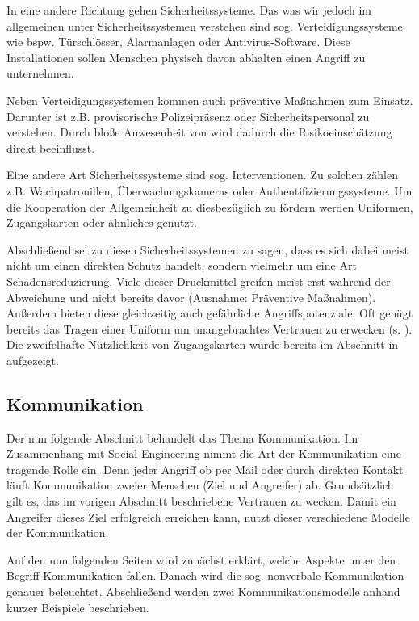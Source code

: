 In eine andere Richtung gehen Sicherheitssysteme. Das was wir jedoch im allgemeinen unter Sicherheitssystemen verstehen sind sog. Verteidigungssysteme wie bspw. Türschlösser, Alarmanlagen oder Antivirus-Software.
Diese Installationen sollen Menschen physisch davon abhalten einen Angriff zu unternehmen.

Neben Verteidigungssystemen kommen auch präventive Maßnahmen zum Einsatz.
Darunter ist z.B. provisorische Polizeipräsenz oder Sicherheitspersonal zu verstehen.
Durch bloße Anwesenheit von wird dadurch die Risikoeinschätzung direkt beeinflusst.

Eine andere Art Sicherheitssysteme sind sog. Interventionen. Zu solchen zählen z.B. Wachpatrouillen, Überwachungskameras oder Authentifizierungssysteme.
Um die Kooperation der Allgemeinheit zu diesbezüglich zu fördern werden Uniformen, Zugangskarten oder ähnliches genutzt.
\cite{liars-and-outliers}

Abschließend sei zu diesen Sicherheitssystemen zu sagen, dass es sich dabei meist nicht um einen direkten Schutz handelt, sondern vielmehr um eine Art Schadensreduzierung.
Viele dieser Druckmittel greifen meist erst während der Abweichung und nicht bereits davor (Ausnahme: Präventive Maßnahmen).
Außerdem bieten diese  gleichzeitig auch gefährliche Angriffspotenziale.
Oft genügt bereits das Tragen einer Uniform um unangebrachtes Vertrauen zu erwecken (s. ). Die zweifelhafte Nützlichkeit von Zugangskarten würde bereits im Abschnitt  in  aufgezeigt.

\subsection{Kommunikation}\label{sec:kommunikation}

Der nun folgende Abschnitt behandelt das Thema Kommunikation.
Im Zusammenhang mit Social Engineering nimmt die Art der Kommunikation eine tragende Rolle ein.
Denn jeder Angriff ob per Mail oder durch direkten Kontakt läuft Kommunikation zweier Menschen (Ziel und Angreifer) ab.
Grundsätzlich gilt es, das im vorigen Abschnitt beschriebene Vertrauen zu wecken.
Damit ein Angreifer dieses Ziel erfolgreich erreichen kann, nutzt dieser verschiedene Modelle der Kommunikation.

Auf den nun folgenden Seiten wird zunächst erklärt, welche Aspekte unter den Begriff Kommunikation fallen.
Danach wird die sog. nonverbale Kommunikation genauer beleuchtet.
Abschließend werden zwei Kommunikationsmodelle anhand kurzer Beispiele beschrieben.


